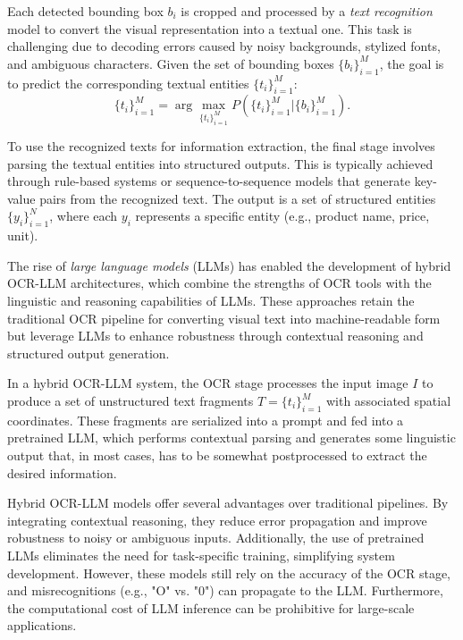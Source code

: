 \documentclass[11pt]{article}
\begin{document}
Each detected bounding box $ b_i $ is cropped and processed by a \emph{text recognition} model to convert the visual representation into a textual one. This task is challenging due to decoding errors caused by noisy backgrounds, stylized fonts, and ambiguous characters. Given the set of bounding boxes $ \{b_i\}_{i=1}^{M} $, the goal is to predict the corresponding textual entities $ \{t_i\}_{i=1}^{M} $:  
\begin{equation}
\{t_i\}_{i=1}^{M} = \arg\max_{\{t_i\}_{i=1}^{M}} P(\{t_i\}_{i=1}^{M} | \{b_i\}_{i=1}^{M}).
\end{equation}  

To use the recognized texts for information extraction, the final stage involves parsing the textual entities into structured outputs. This is typically achieved through rule-based systems or sequence-to-sequence models that generate key-value pairs from the recognized text. The output is a set of structured entities $ \{y_i\}_{i=1}^{N} $, where each $ y_i $ represents a specific entity (e.g., product name, price, unit).

The rise of \emph{large language models }(LLMs) has enabled the development of hybrid OCR-LLM architectures, which combine the strengths of OCR tools with the linguistic and reasoning capabilities of LLMs. These approaches retain the traditional OCR pipeline for converting visual text into machine-readable form but leverage LLMs to enhance robustness through contextual reasoning and structured output generation.

In a hybrid OCR-LLM system, the OCR stage processes the input image $ I $ to produce a set of unstructured text fragments $ T = \{t_i\}_{i=1}^{M} $ with associated spatial coordinates. These fragments are serialized into a prompt and fed into a pretrained LLM, which performs contextual parsing and generates some linguistic output that, in most cases, has to be somewhat postprocessed to extract the desired information.

Hybrid OCR-LLM models offer several advantages over traditional pipelines. By integrating contextual reasoning, they reduce error propagation and improve robustness to noisy or ambiguous inputs. Additionally, the use of pretrained LLMs eliminates the need for task-specific training, simplifying system development. However, these models still rely on the accuracy of the OCR stage, and misrecognitions (e.g., "O" vs. "0") can propagate to the LLM. Furthermore, the computational cost of LLM inference can be prohibitive for large-scale applications.
\end{document}

